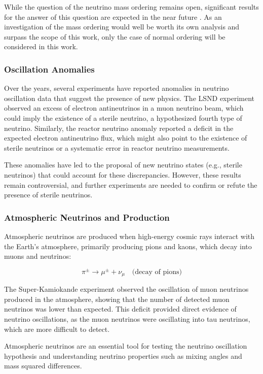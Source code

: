 \documentclass[a4paper,12pt,numbered]{article}
\begin{document}
While the question of the neutrino mass ordering remains open, significant results for the answer of this question are expected in the near future \cite{future_nmo_sensitivity}. As an investigation of the mass ordering would well be worth its own analysis and surpass the scope of this work, only the case of normal ordering will be considered in this work.

\subsubsection{Oscillation Anomalies}
Over the years, several experiments have reported anomalies in neutrino oscillation data that suggest the presence of new physics. The LSND experiment observed an excess of electron antineutrinos in a muon neutrino beam, which could imply the existence of a sterile neutrino, a hypothesized fourth type of neutrino. Similarly, the reactor neutrino anomaly reported a deficit in the expected electron antineutrino flux, which might also point to the existence of sterile neutrinos or a systematic error in reactor neutrino measurements.

These anomalies have led to the proposal of new neutrino states (e.g., sterile neutrinos) that could account for these discrepancies. However, these results remain controversial, and further experiments are needed to confirm or refute the presence of sterile neutrinos.

\subsubsection{Atmospheric Neutrinos and Production}
Atmospheric neutrinos are produced when high-energy cosmic rays interact with the Earth's atmosphere, primarily producing pions and kaons, which decay into muons and neutrinos:

\[
\pi^\pm \to \mu^\pm + \nu_\mu \quad \text{(decay of pions)}
\]

The Super-Kamiokande experiment observed the oscillation of muon neutrinos produced in the atmosphere, showing that the number of detected muon neutrinos was lower than expected. This deficit provided direct evidence of neutrino oscillations, as the muon neutrinos were oscillating into tau neutrinos, which are more difficult to detect.

Atmospheric neutrinos are an essential tool for testing the neutrino oscillation hypothesis and understanding neutrino properties such as mixing angles and mass squared differences.
\end{document}
